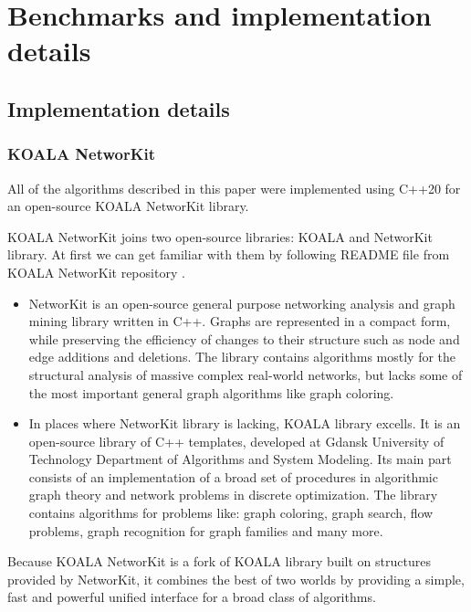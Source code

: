 \chapter{Benchmarks and implementation details}
\section{Implementation details}
\subsection{KOALA NetworKit}
All of the algorithms described in this paper were implemented 
using \textsc{C++20} for an open-source KOALA NetworKit \cite{turowski_koala_networkit} library.

KOALA NetworKit joins two open-source libraries: KOALA and 
NetworKit library. At first we can get familiar with them by following 
README file from KOALA NetworKit repository \cite{turowski_koala_networkit}.

\begin{itemize}
    \item NetworKit \cite{staudt2016networkit} is an open-source general purpose networking analysis
        and graph mining library written in \textsc{C++}. Graphs are 
        represented in a compact form, while preserving the efficiency 
        of changes to their structure such as node and edge additions 
        and deletions. The library contains algorithms mostly for 
        the structural analysis of massive complex real-world networks,
        but lacks some of the most important general graph algorithms like 
        graph coloring.
    \item In places where NetworKit library is lacking, KOALA \cite{dobrowolski2008koala} library excells.
        It is an open-source library of C++ templates, developed at Gdansk 
        University of Technology Department of Algorithms and System Modeling.
        Its main part consists of an implementation of a broad set of 
        procedures in algorithmic graph theory and network problems in discrete 
        optimization. The library contains algorithms for problems like: graph coloring, 
        graph search, flow problems, graph recognition for graph families and many more.
\end{itemize}

Because KOALA NetworKit is a fork of KOALA library built on structures provided 
by NetworKit, it combines the best of two worlds by providing a simple, fast 
and powerful unified interface for a broad class of algorithms.


